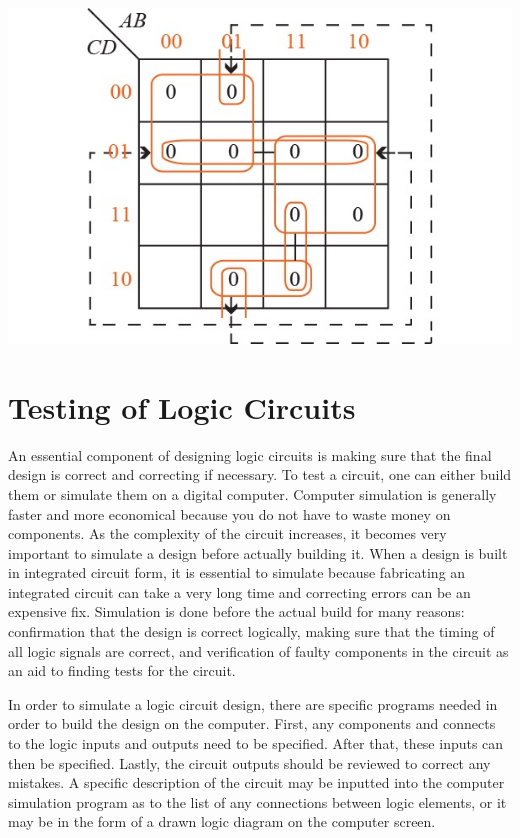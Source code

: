 \documentclass[12pt]{article}
\begin{document}
\begin{center}
	\includegraphics[scale=0.8]{./karnaugh-map-1-5.jpg}
\end{center}


\section{Testing of Logic Circuits}

An essential component of designing logic circuits is making sure that the final design is correct and correcting if necessary. To test a circuit, one can either build them or simulate them on a digital computer. Computer simulation is generally faster and more economical because you do not have to waste money on components. As the complexity of the circuit increases, it becomes very important to simulate a design before actually building it. When a design is built in integrated circuit form, it is essential to simulate because fabricating an integrated circuit can take a very long time and correcting errors can be an expensive fix. Simulation is done before the actual build for many reasons: confirmation that the design is correct logically, making sure that the timing of all logic signals are correct, and verification of faulty components in the circuit as an aid to finding tests for the circuit. 

In order to simulate a logic circuit design, there are specific programs needed in order to build the design on the computer. First, any components and connects to the logic inputs and outputs need to be specified. After that, these inputs can then be specified. Lastly, the circuit outputs should be reviewed to correct any mistakes. A specific description of the circuit may be inputted into the computer simulation program as to the list of any connections between logic elements, or it may be in the form of a drawn logic diagram on the computer screen. 
\end{document}
